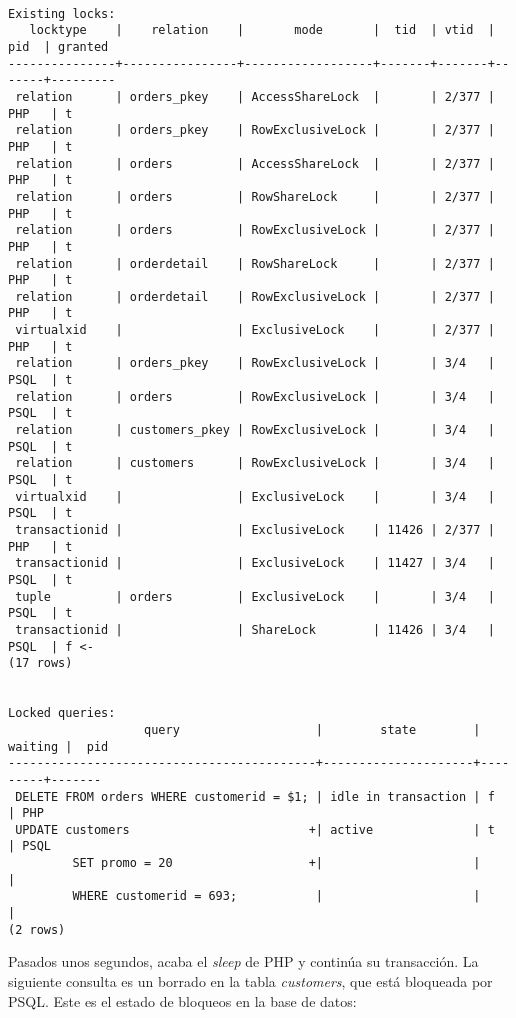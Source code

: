 \documentclass{article}
\begin{document}
\begin{Verbatim}[frame=lines]

Existing locks:
   locktype    |    relation    |       mode       |  tid  | vtid  |  pid  | granted
---------------+----------------+------------------+-------+-------+-------+---------
 relation      | orders_pkey    | AccessShareLock  |       | 2/377 | PHP   | t
 relation      | orders_pkey    | RowExclusiveLock |       | 2/377 | PHP   | t
 relation      | orders         | AccessShareLock  |       | 2/377 | PHP   | t
 relation      | orders         | RowShareLock     |       | 2/377 | PHP   | t
 relation      | orders         | RowExclusiveLock |       | 2/377 | PHP   | t
 relation      | orderdetail    | RowShareLock     |       | 2/377 | PHP   | t
 relation      | orderdetail    | RowExclusiveLock |       | 2/377 | PHP   | t
 virtualxid    |                | ExclusiveLock    |       | 2/377 | PHP   | t
 relation      | orders_pkey    | RowExclusiveLock |       | 3/4   | PSQL  | t
 relation      | orders         | RowExclusiveLock |       | 3/4   | PSQL  | t
 relation      | customers_pkey | RowExclusiveLock |       | 3/4   | PSQL  | t
 relation      | customers      | RowExclusiveLock |       | 3/4   | PSQL  | t
 virtualxid    |                | ExclusiveLock    |       | 3/4   | PSQL  | t
 transactionid |                | ExclusiveLock    | 11426 | 2/377 | PHP   | t
 transactionid |                | ExclusiveLock    | 11427 | 3/4   | PSQL  | t
 tuple         | orders         | ExclusiveLock    |       | 3/4   | PSQL  | t
 transactionid |                | ShareLock        | 11426 | 3/4   | PSQL  | f <-
(17 rows)


Locked queries:
                   query                   |        state        | waiting |  pid
-------------------------------------------+---------------------+---------+-------
 DELETE FROM orders WHERE customerid = $1; | idle in transaction | f       | PHP
 UPDATE customers                         +| active              | t       | PSQL
         SET promo = 20                   +|                     |         |
         WHERE customerid = 693;           |                     |         |
(2 rows)
\end{Verbatim}

Pasados unos segundos, acaba el \textit{sleep} de PHP y continúa su transacción. La siguiente consulta es un borrado en la tabla \textit{customers}, que está bloqueada por PSQL. Este es el estado de bloqueos en la base de datos:
\end{document}
